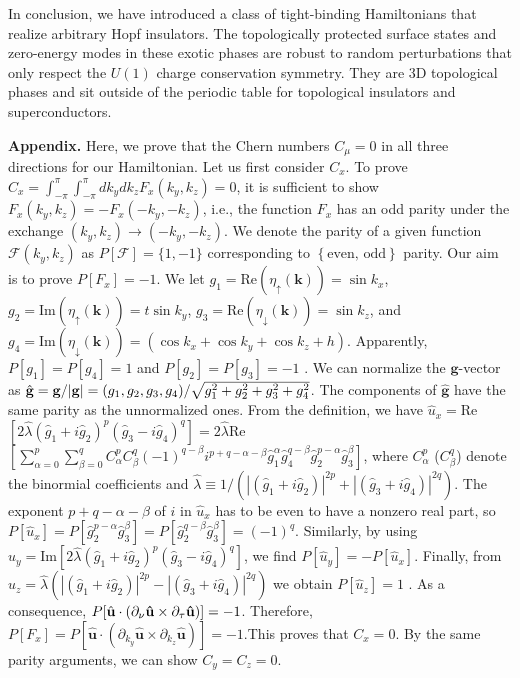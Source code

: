 \documentclass[twocolumn,prb,aps,epsfig,superscriptaddress,showpacs]{revtex4-1}
\begin{document}
In conclusion, we have introduced a class of tight-binding Hamiltonians that
realize arbitrary Hopf insulators. The topologically protected surface
states and zero-energy modes in these exotic phases are robust to random
perturbations that only respect the $U(1)$ charge conservation symmetry.
They are $3$D topological phases and sit outside of the periodic table \cite%
{2009Kitaev,2008Schnyder} for topological insulators and superconductors.

\textbf{Appendix. }Here, we prove that the Chern numbers $C_{\mu }=0$ in all
three directions for our Hamiltonian. Let us first consider $C_{x}$. To
prove $C_{x}=\int_{-\pi }^{\pi }\int_{-\pi }^{\pi
}dk_{y}dk_{z}F_{x}(k_{y},k_{z})=0$, it is sufficient to show $%
F_{x}(k_{y},k_{z})=-F_{x}(-k_{y},-k_{z})$, i.e., the function $F_{x}$ has an
odd parity under the exchange $(k_{y},k_{z})\rightarrow (-k_{y},-k_{z})$. We
denote the parity of a given function $\mathcal{F}(k_{y},k_{z})$ as $P[%
\mathcal{F}]=\{1,-1\}$ corresponding to $\left\{ \text{even, odd}\right\} $
parity. Our aim is to prove $P[F_{x}]=-1$. We let $g_{1}=\text{Re}(\eta
_{\uparrow }\mathbf{(k)})=\sin k_{x}$, $g_{2}=\text{Im}(\eta _{\uparrow }%
\mathbf{(k)})=t\sin k_{y}$, $g_{3}=\text{Re}(\eta _{\downarrow }\mathbf{(k)}%
)=\sin k_{z}$, and $g_{4}=\text{Im}(\eta _{\downarrow }\mathbf{(k)})=(\cos
k_{x}+\cos k_{y}+\cos k_{z}+h).$ Apparently, $P[g_{1}]=P[g_{4}]=1$ and $%
P[g_{2}]=P[g_{3}]=-1$ . We can normalize the $\mathbf{g}$-vector as $\hat{%
\mathbf{g}}=\mathbf{g}/|\mathbf{g}|=(g_{1},g_{2},g_{3},g_{4})/\sqrt{%
g_{1}^{2}+g_{2}^{2}+g_{3}^{2}+g_{4}^{2}}$. The components of $\hat{\mathbf{g}%
}$ have the same parity as the unnormalized ones. From the definition, we
have $\hat{u}_{x}=$Re$\left[ 2\hat{\lambda}(\hat{g}_{1}+i\hat{g}_{2})^{p}(%
\hat{g}_{3}-i\hat{g}_{4})^{q}\right] =2\hat{\lambda}$Re$\left[ \sum_{\alpha
=0}^{p}\sum_{\beta =0}^{q}C_{\alpha }^{p}C_{\beta }^{q}(-1)^{q-\beta
}i{}^{p+q-\alpha -\beta }\hat{g}_{1}^{\alpha }\hat{g}_{4}^{q-\beta }\hat{g}%
_{2}^{p-\alpha }\hat{g}_{3}^{\beta }\right] $, where $C_{\alpha }^{p}$ ($%
C_{\beta }^{q}$) denote the binormial coefficients and $\hat{\lambda}\equiv
1/(|(\hat{g}_{1}+i\hat{g}_{2})|^{2p}+|(\hat{g}_{3}+i\hat{g}_{4})|^{2q})$.
The exponent $p+q-\alpha -\beta $ of $i$ in $\hat{u}_{x}$ has to be even to
have a nonzero real part, so $P[\hat{u}_{x}]=P[\hat{g}_{2}^{p-\alpha }\hat{g}%
_{3}^{\beta }]=P[\hat{g}_{2}^{q-\beta }\hat{g}_{3}^{\beta }]=(-1)^{q}$.
Similarly, by using $\hat{u}_{y}=\text{Im}[2\hat{\lambda}(\hat{g}_{1}+i\hat{g%
}_{2})^{p}(\hat{g}_{3}-i\hat{g}_{4})^{q}]$, we find $P[\hat{u}_{y}]=-P[\hat{u%
}_{x}]$. Finally, from $\hat{u}_{z}=\hat{\lambda}(|(\hat{g}_{1}+i\hat{g}%
_{2})|^{2p}-|(\hat{g}_{3}+i\hat{g}_{4})|^{2q})$ we obtain $P[\hat{u}_{z}]=1$%
. As a consequence, $P[\hat{\mathbf{u}}\cdot (\partial _{\nu }\mathbf{\hat{%
\mathbf{u}}\times \partial _{\tau }\hat{\mathbf{u}}})]=-1$. Therefore, $%
P[F_{x}]=P[\hat{\mathbf{u}}\cdot (\partial _{k_{y}}\mathbf{\hat{\mathbf{u}}}%
\times \partial _{k_{z}}\hat{\mathbf{u}})]=-1.$This proves that $C_{x}=0$.
By the same parity arguments, we can show $C_{y}=C_{z}=0$.
\end{document}
